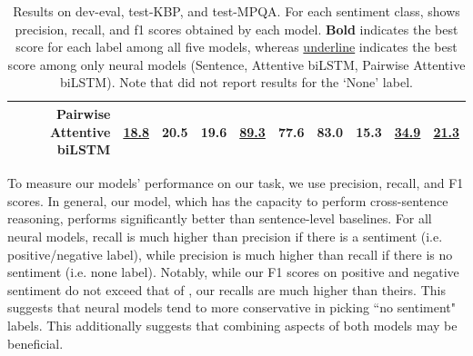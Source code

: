 \documentclass[11pt,a4paper]{article}
\begin{document}
\begin{table}[!t]
\begin{tabular}{| c | r | l | l | l | l | l | l | l | l | l |}
& Pairwise Attentive biLSTM	& \underline{18.8}	& 20.5	& 19.6	& \underline{89.3}	& 77.6	& 83.0	& 15.3	& \underline{\textbf{34.9}}	& \underline{21.3} \\ \hline
\end{tabular}
\caption{\label{tab:results-dev} Results on dev-eval, test-KBP, and test-MPQA. For each sentiment class, shows precision, recall, and f1 scores obtained by each model. \textbf{Bold} indicates the best score for each label among all five models, whereas \underline{underline} indicates the best score among only neural models (Sentence, Attentive biLSTM, Pairwise Attentive biLSTM). Note that \citet{Choi:16} did not report results for the `None' label.}
\end{table}

To measure our models' performance on our task, we use precision, recall, and F1 scores.
In general, our model, which has the capacity to perform cross-sentence reasoning, performs significantly better than sentence-level baselines.
For all neural models, recall is much higher than precision if there is a sentiment (i.e. positive/negative label), while precision is much higher than recall if there is no sentiment (i.e. none label). Notably, while our F1 scores on positive and negative sentiment do not exceed that of \citet{Choi:16}, our recalls are much higher than theirs. This suggests that neural models tend to more conservative in picking ``no sentiment" labels. This additionally suggests that combining aspects of both models may be beneficial.
\end{document}
